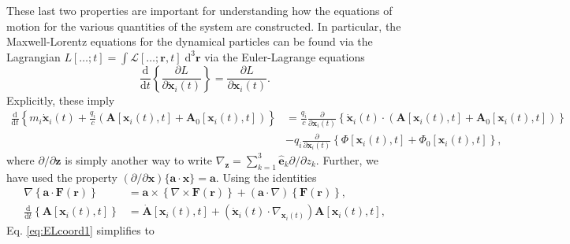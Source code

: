 \documentclass{article}
\begin{document}
These last two properties are important for understanding how the equations of motion for the various quantities of the system are constructed. In particular, the Maxwell-Lorentz equations for the dynamical particles can be found via the Lagrangian $L[\ldots;t] = \int\mathcal{L}[\ldots;\mathbf{r},t]\;\mathrm{d}^3\mathbf{r}$ via the Euler-Lagrange equations
\begin{equation}
\frac{\mathrm{d}}{\mathrm{d}t}\left\{\frac{\partial L}{\partial \dot{\mathbf{x}}_i(t)}\right\} = \frac{\partial L}{\partial \mathbf{x}_i(t)}.
\end{equation}
Explicitly, these imply
\begin{equation}\label{eq:ELcoord1}
\begin{split}
\frac{\mathrm{d}}{\mathrm{d}t}\left\{m_i\dot{\mathbf{x}}_i(t) + \frac{q_i}{c}\left(\mathbf{A}[\mathbf{x}_i(t),t] + \mathbf{A}_0[\mathbf{x}_i(t),t]\right)\right\} &= \frac{q_i}{c}\frac{\partial}{\partial\mathbf{x}_i(t)}\left\{\dot{\mathbf{x}}_i(t)\cdot\left(\mathbf{A}[\mathbf{x}_i(t),t] + \mathbf{A}_0[\mathbf{x}_i(t),t]\right)\right\}\\
&- q_i\frac{\partial}{\partial\mathbf{x}_i(t)}\left\{\Phi[\mathbf{x}_i(t),t] + \Phi_0[\mathbf{x}_i(t),t]\right\},
\end{split}
\end{equation}
where $\partial/\partial\mathbf{z}$ is simply another way to write $\nabla_{\mathbf{z}} = \sum_{k = 1}^3\hat{\mathbf{e}}_k\partial/\partial z_k$. Further, we have used the property $(\partial/\partial\mathbf{x})\{\mathbf{a}\cdot\mathbf{x}\} = \mathbf{a}$. Using the identities
\begin{equation}
\begin{split}
\nabla\left\{\mathbf{a}\cdot\mathbf{F}(\mathbf{r})\right\} &= \mathbf{a}\times\left\{\nabla\times\mathbf{F}(\mathbf{r})\right\} + (\mathbf{a}\cdot\nabla)\left\{\mathbf{F}(\mathbf{r})\right\},\\
\frac{\mathrm{d}}{\mathrm{d}t}\left\{\mathbf{A}[\mathbf{x}_i(t),t]\right\} &= \dot{\mathbf{A}}[\mathbf{x}_i(t),t] + \left(\dot{\mathbf{x}}_i(t)\cdot\nabla_{\mathbf{x}_i(t)}\right)\mathbf{A}[\mathbf{x}_i(t),t],
\end{split}
\end{equation}
Eq. \eqref{eq:ELcoord1} simplifies to
\end{document}

